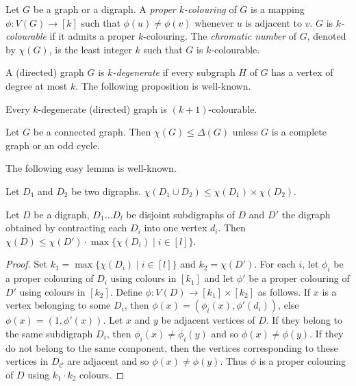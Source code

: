 \documentclass{endm}
\begin{document}
\smallskip

Let $G$ be a graph or a digraph.
A {\it proper $k$-colouring} of $G$ is a mapping $\phi: V(G) \rightarrow [k]$ such that $\phi(u) \neq \phi(v)$ whenever $u$ is adjacent to $v$. 
$G$ is {\it $k$-colourable} if it admits a proper $k$-colouring. The {\it chromatic number} of $G$, denoted by $\chi(G)$, is the least integer $k$
such that $G$ is $k$-colourable. 


A (directed) graph $G$ is {\it $k$-degenerate} if every subgraph $H$ of $G$ has a vertex of degree at most $k$.
The following proposition is well-known.
\begin{proposition}\label{prop:deg}
Every $k$-degenerate (directed) graph is $(k+1)$-colourable.
\end{proposition}

\begin{theorem}[Brooks]\label{thm:brooks}
Let $G$ be a connected graph.
Then $\chi(G)\leq \Delta(G)$ unless $G$ is a complete graph or an odd cycle.
\end{theorem}


The following easy lemma is well-known.

\begin{lemma}\label{lem:decomp}
Let $D_1$ and $D_2$ be two digraphs.
$\chi(D_1\cup D_2) \leq \chi(D_1)\times \chi(D_2)$.
\end{lemma}



\begin{lemma}\label{lem:contrac}
Let $D$ be a digraph, $D_1 \dots D_l$ be disjoint subdigraphs of $D$ and $D'$ the digraph obtained by contracting each $D_i$ into
one vertex $d_i$. Then $\chi(D) \leq \chi(D')\cdot \max\{\chi(D_i) \mid i \in [l]\}$.
\end{lemma}

\begin{proof}

Set $k_1 = \max\{\chi(D_i) \mid i \in [l]\}$ and $k_2 = \chi(D')$. For each $i$, let $\phi_i$ be a proper colouring of $D_i$ using colours in $[k_1]$ and let
$\phi'$ be a proper colouring of $D'$ using colours in $[k_2]$. 
Define $\phi : V(D) \rightarrow [k_1] \times [k_2]$ as follows. If $x$ is a vertex belonging to some $D_i$, then $\phi(x) = (\phi_i(x), \phi'(d_i))$, else $\phi(x) =(1,\phi'(x))$. 
Let $x$ and $y$ be adjacent vertices of $D$. If they belong to the same subdigraph $D_i$, then $\phi_i(x) \not = \phi_i(y)$ and so $\phi(x) \not = \phi(y)$. If they do not belong
to the same component, then the vertices corresponding to these vertices in $D_{\mathcal{C}}$ are adjacent and so $\phi(x) \not = \phi(y)$. 
Thus $\phi$ is a proper colouring of $D$ using $k_1\cdot k_2$ colours. 
\end{proof}
\end{document}
